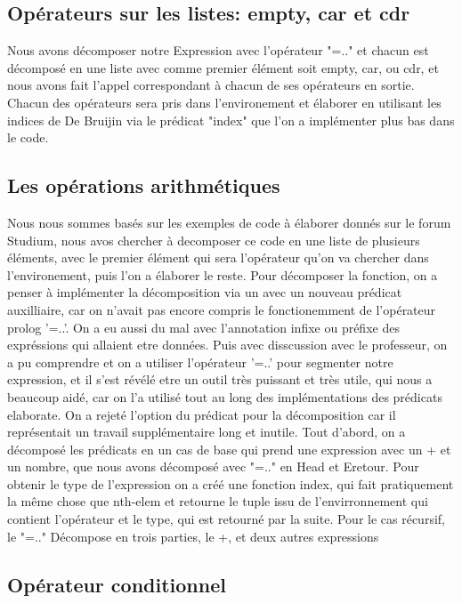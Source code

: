 \documentclass{article}
\begin{document}
\subsection{Opérateurs sur les listes: empty, car et cdr}
Nous avons décomposer notre Expression avec l'opérateur "=.." et chacun est décomposé en une liste
    avec comme premier élément soit empty, car, ou cdr, et nous avons fait 
    l'appel correspondant à chacun de ses opérateurs en sortie. Chacun des opérateurs sera pris dans l'environement et élaborer en utilisant les 
    indices de De Bruijin via le prédicat "index" que l'on a implémenter plus bas dans le code.


\subsection{Les opérations arithmétiques}
Nous nous sommes basés sur les exemples de code à élaborer donnés sur le forum Studium, nous avos chercher à decomposer ce code en une 
    liste de plusieurs éléments, avec le premier élément qui sera l'opérateur qu'on va chercher dans l'environement, puis l'on a élaborer le reste.
    Pour décomposer la fonction, on a penser à implémenter la décomposition via un avec un nouveau prédicat auxilliaire, car on n'avait pas encore compris  le fonctionemment de 
    l'opérateur prolog '=..'. On a eu aussi du mal avec l'annotation infixe ou préfixe des expréssions qui allaient etre données. Puis avec disscussion
    avec le professeur, on a pu  comprendre et on a utiliser l'opérateur '=..' pour segmenter notre expression, et il s'est révélé etre un outil très puissant et très utile,
    qui nous a beaucoup aidé, car on l'a utilisé tout au long des implémentations des prédicats elaborate. On a rejeté l'option du prédicat pour la décomposition car il représentait un travail supplémentaire long et inutile.
    Tout d'abord, on a décomposé les prédicats en un cas de base qui prend une expression avec un + et un nombre, que nous avons décomposé avec "=.." en Head et Eretour. Pour obtenir le type de l'expression on a créé une fonction index, qui fait pratiquement la même chose que nth-elem et retourne le tuple issu de l'envirronnement qui contient l'opérateur et le type, qui est retourné par la suite. Pour le cas récursif, le "=.." Décompose en trois parties, le +, et deux autres expressions
\subsection{Opérateur conditionnel}
\end{document}

